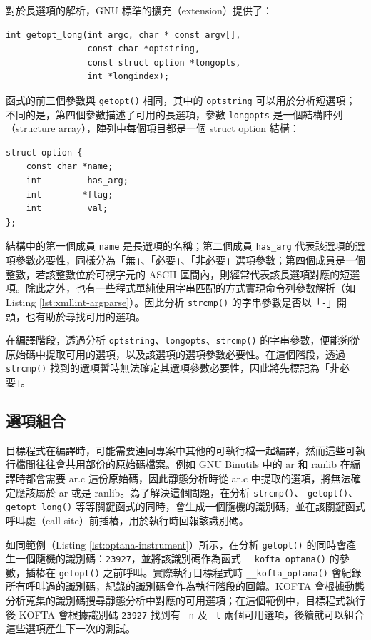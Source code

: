 對於長選項的解析，GNU 標準的擴充（extension）提供了：

\begin{lstlisting}[numbers=none]
int getopt_long(int argc, char * const argv[],
                const char *optstring,
                const struct option *longopts,
                int *longindex);
\end{lstlisting}

函式的前三個參數與 \texttt{getopt()} 相同，其中的 \texttt{optstring} 可以用於分析短選項；不同的是，第四個參數描述了可用的長選項，參數 \texttt{longopts} 是一個結構陣列（structure array），陣列中每個項目都是一個 struct option 結構：

\newpage

\begin{lstlisting}[numbers=none]
struct option {
    const char *name;
    int         has_arg;
    int        *flag;
    int         val;
};
\end{lstlisting}

結構中的第一個成員 \texttt{name} 是長選項的名稱；第二個成員 \texttt{has\_arg} 代表該選項的選項參數必要性，同樣分為「無」、「必要」、「非必要」選項參數；第四個成員是一個整數，若該整數位於可視字元的 ASCII 區間內，則經常代表該長選項對應的短選項。除此之外，也有一些程式單純使用字串匹配的方式實現命令列參數解析（如 Listing \ref{lst:xmllint-argparse}）。因此分析 \texttt{strcmp()} 的字串參數是否以「\texttt{-}」開頭，也有助於尋找可用的選項。

在編譯階段，透過分析 \texttt{optstring}、\texttt{longopts}、\texttt{strcmp()} 的字串參數，便能夠從原始碼中提取可用的選項，以及該選項的選項參數必要性。在這個階段，透過 \texttt{strcmp()} 找到的選項暫時無法確定其選項參數必要性，因此將先標記為「非必要」。

\subsection{選項組合}

目標程式在編譯時，可能需要連同專案中其他的可執行檔一起編譯，然而這些可執行檔間往往會共用部份的原始碼檔案。例如 GNU Binutils 中的 ar 和 ranlib 在編譯時都會需要 ar.c 這份原始碼，因此靜態分析時從 ar.c 中提取的選項，將無法確定應該屬於 ar 或是 ranlib。為了解決這個問題，在分析 \texttt{strcmp()}、 \texttt{getopt()}、 \texttt{getopt\_long()} 等等關鍵函式的同時，會生成一個隨機的識別碼，並在該關鍵函式呼叫處（call site）前插樁，用於執行時回報該識別碼。

如同範例（Listing \ref{lst:optana-instrument}）所示，在分析 \texttt{getopt()} 的同時會產生一個隨機的識別碼：\texttt{23927}，並將該識別碼作為函式 \texttt{\_\_kofta\_optana()} 的參數，插樁在 \texttt{getopt()} 之前呼叫。實際執行目標程式時 \texttt{\_\_kofta\_optana()} 會紀錄所有呼叫過的識別碼，紀錄的識別碼會作為執行階段的回饋。KOFTA 會根據動態分析蒐集的識別碼搜尋靜態分析中對應的可用選項；在這個範例中，目標程式執行後 KOFTA 會根據識別碼 \texttt{23927} 找到有 \texttt{-n} 及 \texttt{-t} 兩個可用選項，後續就可以組合這些選項產生下一次的測試。

